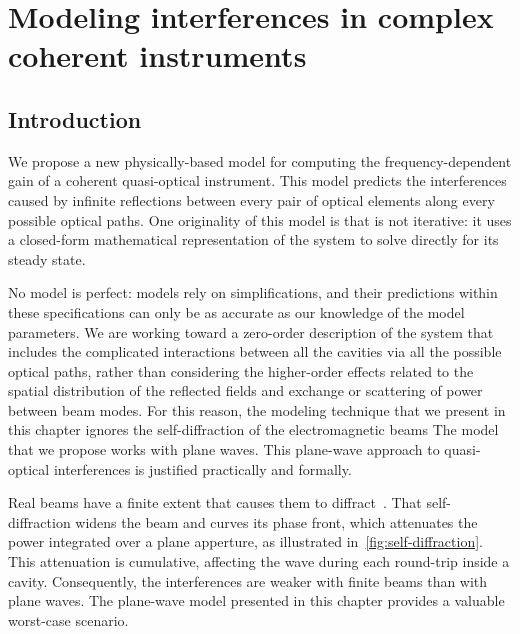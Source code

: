 \cleardoublepage
\chapter{Modeling interferences in complex coherent instruments}
\label{sec:chapter2}

\section{Introduction}
\label{sec:chapter2_0}

We propose a new physically-based model for computing the frequency-dependent gain of a coherent quasi-optical instrument.
This model predicts the interferences caused by infinite reflections between every pair of optical elements along every possible optical paths.
One originality of this model is that is not iterative: it uses a closed-form mathematical representation of the system to solve directly for its steady state.

No model is perfect: models rely on simplifications, and their predictions within these specifications can only be as accurate as our knowledge of the model parameters.
We are working toward a zero-order description of the system that includes the complicated interactions between all the cavities via all the possible optical paths, rather than considering the higher-order effects related to the spatial distribution of the reflected fields and exchange or scattering of power between beam modes.
For this reason, the modeling technique that we present in this chapter ignores the self-diffraction of the electromagnetic beams
The model that we propose works with plane waves.
This plane-wave approach to quasi-optical interferences is justified practically and formally.

Real beams have a finite extent that causes them to diffract~\parencite{goldsmith1998quasioptical}.
That self-diffraction widens the beam and curves its phase front,
which attenuates the power integrated over a plane apperture, as illustrated
in~\cref{fig:self-diffraction}.
This attenuation is cumulative, affecting the wave during each round-trip inside a cavity.
Consequently, the interferences are weaker with finite beams than with plane waves.
The plane-wave model presented in this chapter provides a valuable worst-case scenario.

